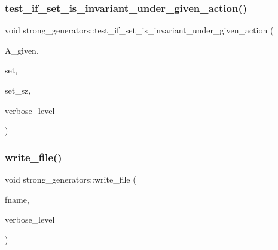 \mbox{\label{classstrong__generators_ac38d27cd666ff5e47ccedd819de73209}} 
\subsubsection{\texorpdfstring{test\+\_\+if\+\_\+set\+\_\+is\+\_\+invariant\+\_\+under\+\_\+given\+\_\+action()}{test\_if\_set\_is\_invariant\_under\_given\_action()}}
{\footnotesize\ttfamily void strong\+\_\+generators\+::test\+\_\+if\+\_\+set\+\_\+is\+\_\+invariant\+\_\+under\+\_\+given\+\_\+action (\begin{DoxyParamCaption}\item[{\mbox{\hyperlink{classaction}{action}} $\ast$}]{A\+\_\+given,  }\item[{\mbox{\hyperlink{galois_8h_a09fddde158a3a20bd2dcadb609de11dc}{I\+NT}} $\ast$}]{set,  }\item[{\mbox{\hyperlink{galois_8h_a09fddde158a3a20bd2dcadb609de11dc}{I\+NT}}}]{set\+\_\+sz,  }\item[{\mbox{\hyperlink{galois_8h_a09fddde158a3a20bd2dcadb609de11dc}{I\+NT}}}]{verbose\+\_\+level }\end{DoxyParamCaption})}

\mbox{\label{classstrong__generators_a7b5e779858a9ac75debf79b3830714d6}} 
\subsubsection{\texorpdfstring{write\+\_\+file()}{write\_file()}}
{\footnotesize\ttfamily void strong\+\_\+generators\+::write\+\_\+file (\begin{DoxyParamCaption}\item[{const \mbox{\hyperlink{galois_8h_ab6cc7b4aeb6ea31aba2b3fbfc83ff5e6}{B\+Y\+TE}} $\ast$}]{fname,  }\item[{\mbox{\hyperlink{galois_8h_a09fddde158a3a20bd2dcadb609de11dc}{I\+NT}}}]{verbose\+\_\+level }\end{DoxyParamCaption})}

